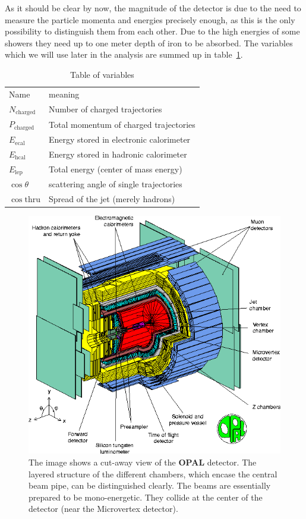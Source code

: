 As it should be clear by now, the magnitude of the detector is due to the need to measure the particle momenta and energies
precisely enough, as this is the only possibility to distinguish them from each other. Due to the high energies of some showers
they need up to one meter depth of iron to be absorbed. The variables which we will use later in the analysis are summed up
in table~\ref{tab:vars}.
\begin{table}[htpb]
    \centering
    \caption{Table of variables}
    \label{tab:vars}
    \begin{tabular}{l|l}
  \rowcolor{LightCyan} Name & meaning \\ 
    $N_{\mathrm{charged} }$ & Number of charged trajectories \\
    $P_{\mathrm{charged} }$ & Total momentum of charged trajectories \\
    $E_{\mathrm{ecal}}$ & Energy stored in electronic calorimeter \\
    $E_{\mathrm{hcal}}$ & Energy stored in hadronic calorimeter \\
    $E_{\mathrm{lep}}$ & Total energy (center of mass energy) \\
    $\cos\theta$ & scattering angle of single trajectories \\
    $\cos\mathrm{thru} $ & Spread of the jet (merely hadrons)\\
    \end{tabular}
\end{table}

\begin{figure}[htpb]
    \centering
    \includegraphics[width=1.0\linewidth]{figures/opal}
    \caption{The image shows a cut-away view of the \textbf{OPAL} detector\cite{CERN_OPAL}. The layered structure of the
    different chambers, which encase the central beam pipe, can be distinguished clearly. The beams are essentially
prepared to be mono-energetic. They collide at the center of the detector (near the Microvertex detector).}
    \label{fig:opal1}
\end{figure}

